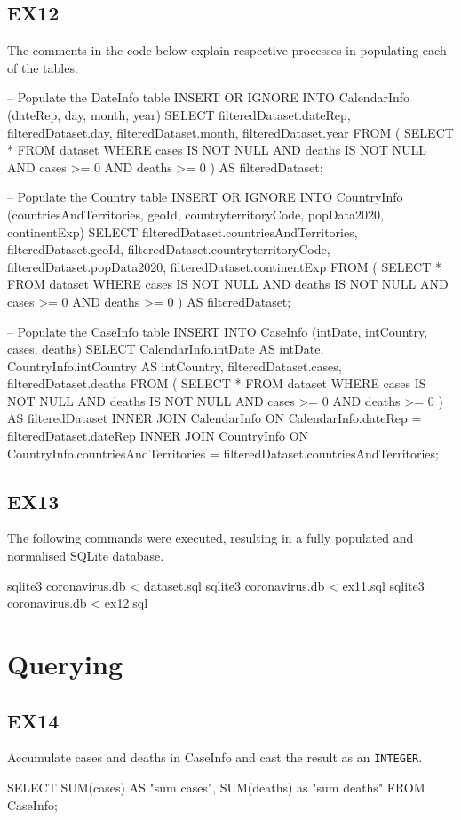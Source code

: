 \documentclass[]{article}
\begin{document}
\subsection{EX12}
The comments in the code below explain respective processes in populating each of the tables.
\begin{ffcode}
-- Populate the DateInfo table
INSERT OR IGNORE INTO CalendarInfo (dateRep, day, month, year)
SELECT
    filteredDataset.dateRep,
    filteredDataset.day,
    filteredDataset.month,
    filteredDataset.year
FROM (
    SELECT * FROM dataset
    WHERE cases IS NOT NULL AND deaths IS NOT NULL AND cases >= 0 AND deaths >= 0
) AS filteredDataset;

-- Populate the Country table
INSERT OR IGNORE INTO CountryInfo (countriesAndTerritories, geoId, countryterritoryCode, popData2020, continentExp)
SELECT
    filteredDataset.countriesAndTerritories,
    filteredDataset.geoId,
    filteredDataset.countryterritoryCode,
    filteredDataset.popData2020,
    filteredDataset.continentExp
FROM (
    SELECT * FROM dataset
    WHERE cases IS NOT NULL AND deaths IS NOT NULL AND cases >= 0 AND deaths >= 0
) AS filteredDataset;

-- Populate the CaseInfo table
INSERT INTO CaseInfo (intDate, intCountry, cases, deaths)
SELECT
    CalendarInfo.intDate AS intDate,
    CountryInfo.intCountry AS intCountry,
    filteredDataset.cases,
    filteredDataset.deaths
FROM (
    SELECT * FROM dataset
    WHERE cases IS NOT NULL AND deaths IS NOT NULL AND cases >= 0 AND deaths >= 0
) AS filteredDataset
INNER JOIN CalendarInfo ON CalendarInfo.dateRep = filteredDataset.dateRep
INNER JOIN CountryInfo ON CountryInfo.countriesAndTerritories = filteredDataset.countriesAndTerritories;
\end{ffcode}
\subsection{EX13}
The following commands were executed, resulting in a fully populated and normalised SQLite database.
\begin{ffcode}
sqlite3 coronavirus.db < dataset.sql
sqlite3 coronavirus.db < ex11.sql
sqlite3 coronavirus.db < ex12.sql
\end{ffcode}
\section{Querying}
\subsection{EX14}
Accumulate cases and deaths in CaseInfo and cast the result as an \verb|INTEGER|.
\begin{ffcode}
SELECT SUM(cases) AS "sum cases", SUM(deaths) as "sum deaths" FROM CaseInfo;
\end{ffcode}
\end{document}
